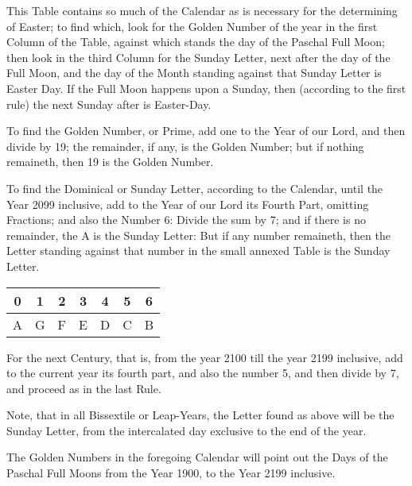{\begin{multicols}{2}
This Table contains so much of the Calendar as is necessary for the determining of Easter; to find which, look for the Golden Number of the year in the first Column of the Table, against which stands the day of the Paschal Full Moon; then look in the third Column for the Sunday Letter, next after the day of the Full Moon, and the day of the Month standing against that Sunday Letter is Easter Day. If the Full Moon happens upon a Sunday, then (according to the first rule) the next Sunday after is Easter-Day.

To find the Golden Number, or Prime, add one to the Year of our Lord, and then divide by 19; the remainder, if any, is the Golden Number; but if nothing remaineth, then 19 is the Golden Number.

To find the Dominical or Sunday Letter, according to the Calendar, until the Year 2099 inclusive, add to the Year of our Lord its Fourth Part, omitting Fractions; and also the Number 6: Divide the sum by 7; and if there is no remainder, the A is the Sunday Letter: But if any number remaineth, then the Letter standing against that number in the small annexed Table is the Sunday Letter.
\vspace{6pt}

{\centering\setlength{\extrarowheight}{2pt}
{\tiny\begin{tabular} { | c c c c c c c | }
\hline
0 & 1 & 2 & 3 & 4 & 5 & 6 \\
\hline
A & G & F & E & D & C & B \\
\hline
\end{tabular}}\par}

\vspace{2pt}
For the next Century, that is, from the year 2100 till the year 2199 inclusive, add to the current year its fourth part, and also the number 5, and then divide by 7, and proceed as in the last Rule.

Note, that in all Bissextile or Leap-Years, the Letter found as above will be the Sunday Letter, from the intercalated day exclusive to the end of the year.

The Golden Numbers in the foregoing Calendar will point out the Days of the Paschal Full Moons from the Year 1900, to the Year 2199 inclusive.
\vspace{12pt}
\end{multicols}}
